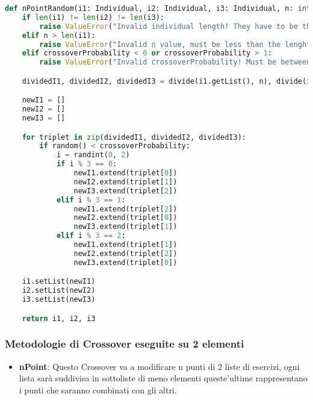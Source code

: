 \documentclass{article}
\begin{document}
\begin{lstlisting}[language=Python, breaklines, no caption]
def nPointRandom(i1: Individual, i2: Individual, i3: Individual, n: int, crossoverProbability: float) -> tuple[Individual, Individual, Individual]:
    if len(i1) != len(i2) != len(i3):
        raise ValueError("Invalid individual length! They have to be the same.")
    elif n > len(i1):
        raise ValueError("Invalid n value, must be less than the lenght of the individual!")
    elif crossoverProbability < 0 or crossoverProbability > 1:
        raise ValueError("Invalid crossoverProbability! Must be between 0 and 1")

    dividedI1, dividedI2, dividedI3 = divide(i1.getList(), n), divide(i2.getList(), n), divide(i3.getList(), n)

    newI1 = []
    newI2 = []
    newI3 = []

    for triplet in zip(dividedI1, dividedI2, dividedI3):
        if random() < crossoverProbability:
            i = randint(0, 2)
            if i % 3 == 0:
                newI1.extend(triplet[0])
                newI2.extend(triplet[1])
                newI3.extend(triplet[2])
            elif i % 3 == 1:
                newI1.extend(triplet[2])
                newI2.extend(triplet[0])
                newI3.extend(triplet[1])
            elif i % 3 == 2:
                newI1.extend(triplet[1])
                newI2.extend(triplet[2])
                newI3.extend(triplet[0])

    i1.setList(newI1)
    i2.setList(newI2)
    i3.setList(newI3)

    return i1, i2, i3
        \end{lstlisting}

\pagebreak

\subsubsection {Metodologie di Crossover eseguite su 2 elementi}

\begin{itemize}
\item\textbf{nPoint}: Questo Crossover va a modificare n punti di 2 liste di esercizi, ogni lista sarà suddivisa in sottoliste di meno elementi queste'ultime rappresentano i punti che saranno combinati con gli altri.
\end{itemize}
\end{document}
